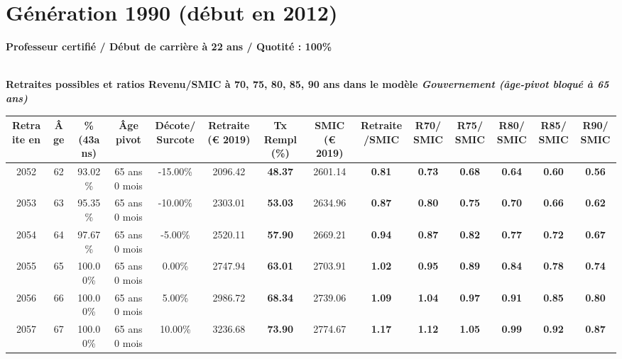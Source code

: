 \newpage 
 
\section{Génération 1990 (début en 2012)\label{ProfCertifie_100_1990_22_0}} 
 
{\bf \noindent Professeur certifié / Début de carrière à 22 ans / Quotité : 100\%}  ~ 

 ~\\{\bf \noindent Retraites possibles et ratios Revenu/SMIC à 70, 75, 80, 85, 90 ans dans le modèle \emph{Gouvernement (âge-pivot bloqué à 65 ans)}}  
 
\begin{adjustbox}{max width=\textwidth} 
\begin{tabular}[htb]{|c|c||c|c|c||c|c||c|c||c|c|c|c|c|} 
\hline 
 Retraite en &  Âge &  \%(43ans) &  Âge pivot &  Décote/Surcote &  Retraite (\euro{} 2019) &  Tx Rempl(\%) &  SMIC (\euro{} 2019) &  Retraite/SMIC &  R70/SMIC &  R75/SMIC &  R80/SMIC &  R85/SMIC &  R90/SMIC \\ 
\hline \hline 
 2052 &  62 &  93.02\% &  65 ans 0 mois &  -15.00\% &  2096.42 &  {\bf 48.37} &  2601.14 &  {\bf {\color{red} 0.81}} &  {\bf {\color{red} 0.73}} &  {\bf {\color{red} 0.68}} &  {\bf {\color{red} 0.64}} &  {\bf {\color{red} 0.60}} &  {\bf {\color{red} 0.56}} \\ 
\hline 
 2053 &  63 &  95.35\% &  65 ans 0 mois &  -10.00\% &  2303.01 &  {\bf 53.03} &  2634.96 &  {\bf {\color{red} 0.87}} &  {\bf {\color{red} 0.80}} &  {\bf {\color{red} 0.75}} &  {\bf {\color{red} 0.70}} &  {\bf {\color{red} 0.66}} &  {\bf {\color{red} 0.62}} \\ 
\hline 
 2054 &  64 &  97.67\% &  65 ans 0 mois &  -5.00\% &  2520.11 &  {\bf 57.90} &  2669.21 &  {\bf {\color{red} 0.94}} &  {\bf {\color{red} 0.87}} &  {\bf {\color{red} 0.82}} &  {\bf {\color{red} 0.77}} &  {\bf {\color{red} 0.72}} &  {\bf {\color{red} 0.67}} \\ 
\hline 
 2055 &  65 &  100.00\% &  65 ans 0 mois &  0.00\% &  2747.94 &  {\bf 63.01} &  2703.91 &  {\bf 1.02} &  {\bf {\color{red} 0.95}} &  {\bf {\color{red} 0.89}} &  {\bf {\color{red} 0.84}} &  {\bf {\color{red} 0.78}} &  {\bf {\color{red} 0.74}} \\ 
\hline 
 2056 &  66 &  100.00\% &  65 ans 0 mois &  5.00\% &  2986.72 &  {\bf 68.34} &  2739.06 &  {\bf 1.09} &  {\bf 1.04} &  {\bf {\color{red} 0.97}} &  {\bf {\color{red} 0.91}} &  {\bf {\color{red} 0.85}} &  {\bf {\color{red} 0.80}} \\ 
\hline 
 2057 &  67 &  100.00\% &  65 ans 0 mois &  10.00\% &  3236.68 &  {\bf 73.90} &  2774.67 &  {\bf 1.17} &  {\bf 1.12} &  {\bf 1.05} &  {\bf {\color{red} 0.99}} &  {\bf {\color{red} 0.92}} &  {\bf {\color{red} 0.87}} \\ 
\hline 
\hline 
\end{tabular} 
\end{adjustbox} 
 
